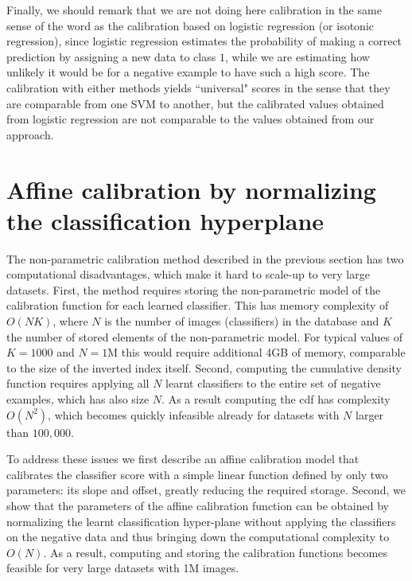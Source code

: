       Finally, we should remark that we are not doing here calibration in the same sense of the word as the calibration based on logistic regression (or isotonic regression), since logistic regression estimates the probability of making a correct prediction by assigning a new data to class $1$, while we are estimating how unlikely it would be for a negative example to have such a high score. The calibration with either methods yields ``universal" scores in the sense that they are comparable from one SVM to another, but the calibrated values obtained from logistic regression are not comparable to the values obtained from our approach.

\section{Affine calibration by normalizing the classification hyperplane}
\label{sec:calibrationRenorm}
  The non-parametric calibration method described in the previous section has two computational disadvantages, which make it hard to scale-up to very large datasets. 
  First, the method requires storing the non-parametric model of the calibration function for each learned classifier. This has memory complexity 
  of $O(NK)$, where $N$ is the number of images (classifiers) in the database and $K$ the number of stored elements of the non-parametric model. For typical values of $K=1000$ and $N=1$M this would require additional 4GB of memory, comparable to the size of the inverted index itself. Second, computing the cumulative density function requires applying all $N$ learnt classifiers to the entire set of negative examples, which has also size $N$. As a result computing the cdf has complexity $O(N^2)$, which becomes quickly infeasible already for datasets with $N$ larger than $100,000$. 
  
  To address these issues we first describe an affine calibration model that calibrates the classifier score with a simple linear function defined by only two parameters: its slope and offset, greatly reducing the required storage.
  Second, we show that the parameters of the affine calibration function can be obtained by normalizing the learnt classification hyper-plane without applying the classifiers on the negative data and thus bringing down the computational complexity to $O(N)$.
  As a result,  computing and storing the calibration functions becomes feasible for very large datasets with 1M images.

